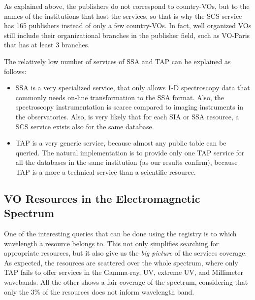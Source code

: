 As explained above, the publishers do not correspond to country-VOs, but 
to the names of the institutions that host the services, so that is why the SCS
service has 165 publishers instead of only a few country-VOs. In fact, well
organized VOs still include their organizational branches in the publisher field, such as VO-Paris that has at least 3 branches.

The relatively low number of services of SSA and TAP can be explained as follows:
\begin{itemize}
\item SSA is a very specialized service, that only allows 1-D spectroscopy data that commonly 
needs on-line transformation to the SSA format. Also, the spectroscopy instrumentation is
scarce compared to imaging instruments in the observatories. Also, is very likely that for each
SIA or SSA resource, a SCS service exists also for the same database.
\item TAP is a very generic service, because almost any public table can be queried. 
The natural implementation is to provide only one TAP service for all the databases
in the same institution (as our results confirm), because TAP is a more a technical 
service than a scientific resource. 
\end{itemize} 

\subsection{VO Resources in the Electromagnetic Spectrum}

One of the interesting queries that can be done using the registry is
to which wavelength a resource belongs to. This not only simplifies
searching for appropriate resources, but it also give us the 
\emph{big picture} of the services coverage. As expected, 
the resources are scattered over the whole spectrum, where
only TAP fails to offer services in the Gamma-ray, UV, extreme UV, and Millimeter
wavebands. All the other shows a fair coverage of the spectrum, considering
that only the 3\% of the resources does not inform wavelength band. 


